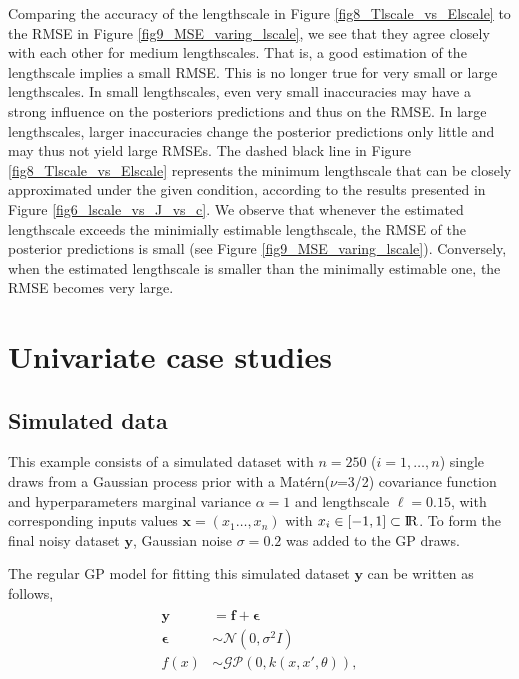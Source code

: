 \documentclass[onecolumn,a4paper,11pt]{article}
\begin{document}
Comparing the accuracy of the lengthscale in Figure 
\ref{fig8_Tlscale_vs_Elscale} to the RMSE in Figure \ref{fig9_MSE_varing_lscale},
we see that they agree closely with each other for medium lengthscales.
That is, a good estimation of the lengthscale implies a
small RMSE. This is no longer true for very small or large lengthscales.
In small lengthscales, even very small inaccuracies 
may have a strong influence on the posteriors predictions and thus on the RMSE.
In large lengthscales, larger inaccuracies change the posterior predictions
only little and may thus not yield large RMSEs.
The dashed black line in Figure \ref{fig8_Tlscale_vs_Elscale} represents the 
minimum lengthscale that can be closely approximated under the given condition, according to the results presented in Figure \ref{fig6_lscale_vs_J_vs_c}. 
We observe that whenever the estimated lengthscale exceeds the minimially
estimable lengthscale, the RMSE of the posterior predictions is small
(see Figure \ref{fig9_MSE_varing_lscale}).
Conversely, when the estimated lengthscale is smaller than the minimally
estimable one, the RMSE becomes very large.


\section{Univariate case studies}\label{ch5_sec_univariate_cases}

\subsection{Simulated data}\label{ch5_sec_univariate_simu}

This example consists of a simulated dataset with $n=250$ ($i=1,\dots,n$) single draws from a Gaussian process prior with a Mat{\'e}rn($\nu$=3/2) covariance function and hyperparameters marginal variance $\alpha=1$ and lengthscale $\ell=0.15$, with corresponding inputs values $\bm{x}=(x_1\dots,x_n)$ with $x_i \in [-1,1] \subset {\rm I\!R}$. To form the final noisy dataset $\bm{y}$, Gaussian noise $\sigma=0.2$ was added to the GP draws.

The regular GP model for fitting this simulated dataset $\bm{y}$ can be written as follows,
%
\begin{eqnarray*}\label{ch5_eq_latentgp_simudata1}
\begin{split}
\bm{y} &= \bm{f} + \bm{\epsilon} \\
\bm{\epsilon} &\sim \mathcal{N}(0, \sigma^2  I) \\
f(x) &\sim \mathcal{GP}(0, k(x, x', \theta)),
\end{split}
\end{eqnarray*}
\end{document}
